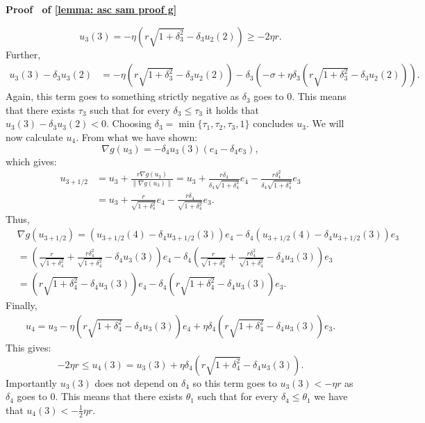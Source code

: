 \documentclass[11pt]{article}
\newcommand{\rad}{r}
\renewenvironment{proof}[1][]{%
  \par\noindent\textbf{\upshape Proof%
  \if\relax\detokenize{#1}\relax\else\ #1\fi}\ %
}{\jmlrQED}
\begin{document}
\begin{proof}[of \cref{lemma: asc sam proof g}]
$$u_{3}(3) = -\eta \left(\rad  \sqrt{1+ \delta_3^2} - \delta_3 u_2(2)\right) \geq -2\eta \rad.$$
Further,
\begin{align*}
    u_3(3) - \delta_3 u_3(2) &= -\eta \left(\rad  \sqrt{1+ \delta_3^2} - \delta_3 u_2(2)\right) - \delta_3 \left( -\sigma +  \eta \delta_3 \left(\rad  \sqrt{1+ \delta_3^2} - \delta_3 u_2(2)\right)\right).
\end{align*}
Again, this term goes to something strictly negative as $\delta_3$ goes to $0$. This means that there exists $\tau_3$ such that for every $\delta_3 \leq \tau_3$ it holds that $u_3(3) - \delta_3 u_3(2) < 0$. Choosing $\delta_3 = \min \{\tau_1,\tau_2, \tau_3,1\}$ concludes $u_3$. We will now calculate $u_4$. From what we have shown: 
$$\nabla g(u_3) = -\delta_4u_3(3)(e_4 - \delta_4 e_3),$$
which gives:
\begin{align*}
    u_{3+1/2} & = u_3 + \frac{\rad \nabla g(u_3)}{\|\nabla g(u_3)\|} = u_3 + \frac{\rad\delta_4}{\delta_4\sqrt{1+ \delta_4^2}}e_4 - \frac{\rad \delta_4^2}{\delta_4\sqrt{ 1+ \delta_4^2}}e_3 \\
    & = u_3 + \frac{\rad}{\sqrt{1+ \delta_4^2}}e_4 - \frac{\rad \delta_4}{\sqrt{ 1+ \delta_4^2}}e_3.
\end{align*}
Thus,
\begin{align*}
    & \nabla g(u_{3+1/2}) = (u_{3+1/2}(4) - \delta_4 u_{3+1/2}(3)) e_{4} -\delta_4 (u_{3+1/2}(4) - \delta_4 u_{3+1/2}(3)) e_{3} \\
    & = \left(\frac{\rad}{\sqrt{1+\delta_4^2}} + \frac{\rad  \delta_4^2}{\sqrt{1+ \delta_4^2}} -\delta_4 u_3(3)\right)e_{4} - \delta_4 \left(\frac{\rad}{\sqrt{1+\delta_4^2}} + \frac{\rad  \delta_4^2}{\sqrt{1+ \delta_4^2}} -\delta_4 u_3(3)\right)e_{3} \\
    & = \left(\rad  \sqrt{1+ \delta_4^2} - \delta_4 u_3(3)\right) e_4 - \delta_4 \left(\rad  \sqrt{1+ \delta_4^2} - \delta_4 u_3(3)\right) e_{3}. 
\end{align*}
Finally, 
\begin{align*}
    u_4 = u_3 - \eta \left(\rad  \sqrt{1+ \delta_4^2} - \delta_4 u_3(3)\right) e_4 + \eta \delta_4 \left(\rad  \sqrt{1+ \delta_4^2} - \delta_4 u_3(3)\right) e_{3}. 
\end{align*} 
This gives:
$$- 2\eta\rad \leq u_4(3) = u_3(3) +  \eta \delta_4 \left(\rad  \sqrt{1+ \delta_4^2} - \delta_4 u_3(3)\right).$$
Importantly $u_3(3)$ does not depend on $\delta_4$ so this term goes to $u_3(3) < -\eta \rad$ as $\delta_4$ goes to $0$. This means that there exists $\theta_1$ such that for every $\delta_4 \leq \theta_1$ we have that $u_4(3) < -\frac{1}{2} \eta\rad$.

\end{proof}
\end{document}

